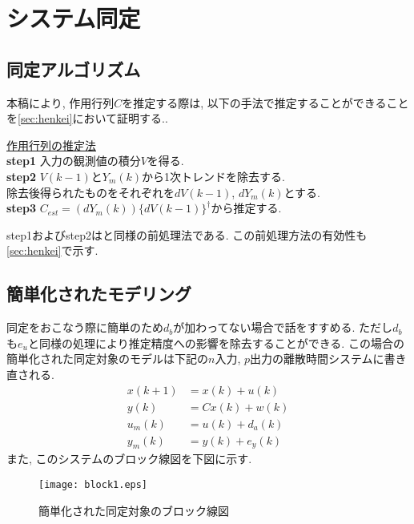 \documentclass[a4paper,12pt]{jbook}
\begin{document}
\chapter{システム同定}
\section{同定アルゴリズム} \label{sec:est}
本稿により, 作用行列$C$を推定する際は, 以下の手法で推定することができることを\ref{sec:henkei}において証明する..\\
\begin{screen}
\underline{作用行列の推定法}\\
{\bf step1} 入力の観測値の積分$V$を得る.\\
{\bf step2} $V(k-1)$と$Y_m(k)$から1次トレンドを除去する. 
\ \ \\除去後得られたものをそれぞれを$dV(k-1)$, $dY_m(k)$とする.\\
{\bf step3} $C_{est} = ( dY_m(k) ) \{ dV(k-1) \}^{\dagger}$から推定する.
\end{screen}

step1およびstep2は\cite{sysiden_a}と同様の前処理法である. この前処理方法の有効性も
\ref{sec:henkei}で示す.

\section{簡単化されたモデリング}

同定をおこなう際に簡単のため$d_b$が加わってない場合で話をすすめる. ただし$d_b$も$e_u$と同様の処理により推定精度への影響を除去することができる. この場合の簡単化された同定対象のモデルは下記の$n$入力, $p$出力の離散時間システムに書き直される.\\
\begin{align}
 x(k+1) &= x(k) + u(k) \label{eqn:sys11} \\
 y(k) &= C x(k) + w(k) \label{eqn:sys12}\\
 u_m(k) &= u(k) + d_a(k) \label{eqn:sys13}\\
 y_m(k) &= y(k) + e_y(k) \label{eqn:sys14}
\end{align}
\newpage
また, このシステムのブロック線図を下図に示す.\\
\begin{figure}[htbp]
 \begin{center}
  \texttt{[image: block1.eps]}
 \end{center}
 \caption{簡単化された同定対象のブロック線図}
 \label{fig:block1}
\end{figure}
\end{document}
